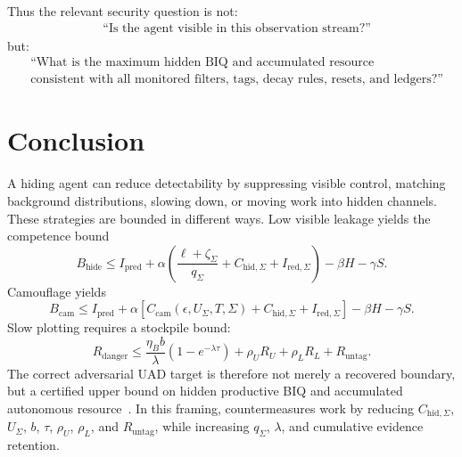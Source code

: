 \documentclass[10pt]{article}
\begin{document}
Thus the relevant security question is not:
\begin{align*}
&\text{``Is the agent visible in this observation stream?''}
\end{align*}
but:
\begin{align*}
&\text{``What is the maximum hidden BIQ and accumulated resource} \\
&\text{consistent with all monitored filters, tags, decay rules, resets, and ledgers?''}
\end{align*}

\section{Conclusion}

A hiding agent can reduce detectability by suppressing visible control, matching background distributions, slowing down, or moving work into hidden channels. These strategies are bounded in different ways. Low visible leakage yields the competence bound
\[
B_{\mathrm{hide}}
\le
I_{\mathrm{pred}}
+
\alpha
\left(
\frac{\ell+\zeta_\Sigma}{q_\Sigma}
+
C_{\mathrm{hid},\Sigma}
+
I_{\mathrm{red},\Sigma}
\right)
-
\beta H
-
\gamma S.
\]
Camouflage yields
\[
B_{\mathrm{cam}}
\le
I_{\mathrm{pred}}
+
\alpha
\left[
C_{\mathrm{cam}}(\epsilon,U_\Sigma,T,\Sigma)
+
C_{\mathrm{hid},\Sigma}
+
I_{\mathrm{red},\Sigma}
\right]
-
\beta H
-
\gamma S.
\]
Slow plotting requires a stockpile bound:
\[
R_{\mathrm{danger}}
\le
\frac{\eta_B b}{\lambda}(1-e^{-\lambda\tau})
+
\rho_U R_U
+
\rho_L R_L
+
R_{\mathrm{untag}}.
\]
The correct adversarial UAD target is therefore not merely a recovered boundary, but a certified upper bound on hidden productive BIQ and accumulated autonomous resource~\cite{friston2010free,kaelbling1998pomdp,biehl2022pomdp,Tishby2000IB}. In this framing, countermeasures work by reducing \(C_{\mathrm{hid},\Sigma}\), \(U_\Sigma\), \(b\), \(\tau\), \(\rho_U\), \(\rho_L\), and \(R_{\mathrm{untag}}\), while increasing \(q_\Sigma\), \(\lambda\), and cumulative evidence retention.



\end{document}
